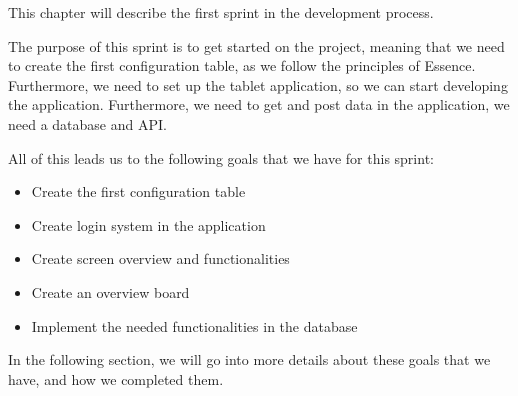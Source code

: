 This chapter will describe the first sprint in the development process.

The purpose of this sprint is to get started on the project, meaning that we need to create the first configuration table, as we follow the principles of Essence.
Furthermore, we need to set up the tablet application, so we can start developing the application.
Furthermore, we need to get and post data in the application, we need a database and API.

All of this leads us to the following goals that we have for this sprint:

\begin{itemize}
    \item Create the first configuration table
    \item Create login system in the application
    \item Create screen overview and functionalities
    \item Create an overview board
    \item Implement the needed functionalities in the database
\end{itemize}

In the following section, we will go into more details about these goals that we have, and how we completed them.
